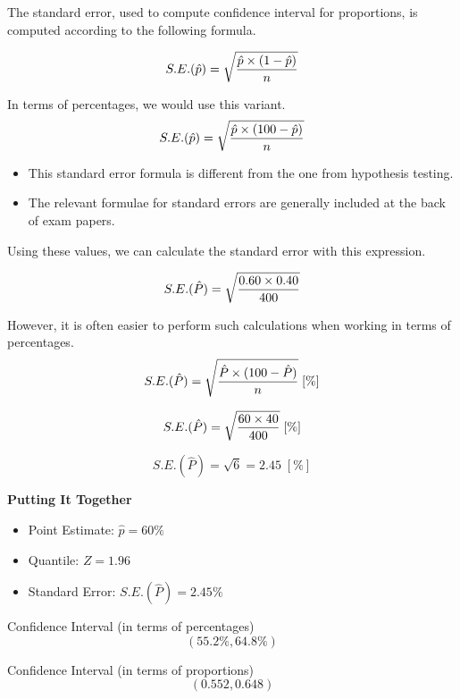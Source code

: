 \documentclass[a4paper,12pt]{article}
\begin{document}

\noindent The standard error, used to compute confidence interval for proportions, is computed according to the following formula.



\[
S.E. (\hat{p}) = \sqrt{ { \hat{p} \times ( 1 - \hat{p}) \over n}}
\]

\noindent In terms of percentages, we would use this variant.
\[
S.E. (\hat{p}) = \sqrt{ { \hat{p} \times ( 100 - \hat{p}) \over n}}
\]


\begin{itemize}
	\item This standard error formula is different from the one from hypothesis testing.
	\item The relevant formulae for standard errors are generally included at the back of exam papers.
\end{itemize}




\noindent Using these values, we can calculate the standard error with this expression.


\[
S.E. (\hat{P}) = \sqrt{ { 0.60 \times 0.40 \over 400}}
\]




However, it is often easier to perform such calculations when working in terms of percentages.
\vspace{0.1cm}
\[
S.E. (\hat{P}) = \sqrt{ { \hat{P} \times ( 100 - \hat{P}) \over n}}
\;[\%] \]

\[
S.E. (\hat{P}) = \sqrt{ { 60 \times 40 \over 400}}  \;[\%]
\]

\[
S.E. (\hat{P}) = \sqrt{ 6 } = 2.45  \;[\%]
\]




\noindent	\textbf{Putting It Together}
\begin{itemize}
	\item Point Estimate:  $\hat{p} = 60\% $
	\vspace{0.2cm}
	\item Quantile: $Z = 1.96 $
	\vspace{0.2cm}
	\item Standard Error:
	$S.E. (\hat{P}) = 2.45 \% $
\end{itemize}
\vspace{0.5cm}

\noindent Confidence Interval (in terms of percentages)
\[  (55.2\%, 64.8 \%)\]

\noindent Confidence Interval (in terms of proportions)
\[  (0.552, 0.648)\]
\end{document}
